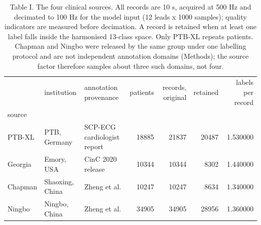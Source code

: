 \begin{table}
\caption{Table I. The four clinical sources. All records are 10 s, acquired at 500 Hz and decimated to 100 Hz for the model input (12 leads x 1000 samples); quality indicators are measured before decimation. A record is retained when at least one label falls inside the harmonised 13-class space. Only PTB-XL repeats patients. Chapman and Ningbo were released by the same group under one labelling protocol and are not independent annotation domains (Methods); the source factor therefore samples about three such domains, not four.}
\begin{tabular}{lllrrrr}
\toprule
 & institution & annotation provenance & patients & records, original & retained & labels per record \\
source &  &  &  &  &  &  \\
\midrule
PTB-XL & PTB, Germany & SCP-ECG cardiologist report & 18885 & 21837 & 20487 & 1.530000 \\
Georgia & Emory, USA & CinC 2020 release & 10344 & 10344 & 8302 & 1.440000 \\
Chapman & Shaoxing, China & Zheng et al. & 10247 & 10247 & 8634 & 1.340000 \\
Ningbo & Ningbo, China & Zheng et al. & 34905 & 34905 & 28956 & 1.360000 \\
\bottomrule
\end{tabular}
\end{table}
